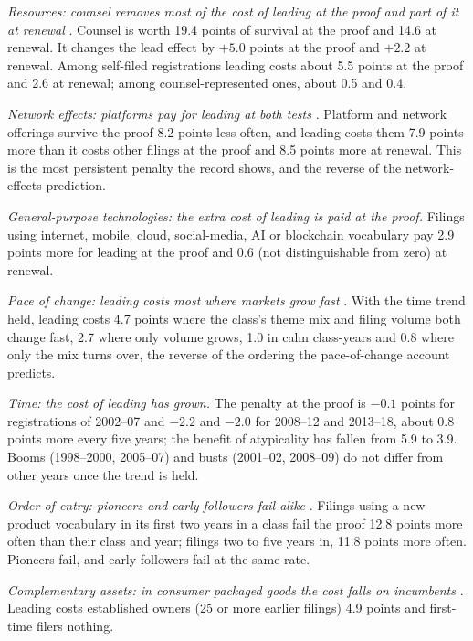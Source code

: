 \emph{Resources: counsel removes most of the cost of leading at the proof
and part of it at renewal} \citep{LiebermanMontgomery1998}. Counsel is
worth 19.4 points of survival at the proof and 14.6 at renewal. It
changes the lead effect by $+5.0$ points at the proof and $+2.2$ at
renewal. Among self-filed registrations leading costs about 5.5 points
at the proof and 2.6 at renewal; among counsel-represented ones, about
0.5 and 0.4.

\emph{Network effects: platforms pay for leading at both tests}
\citep{LiebermanMontgomery1988}. Platform and network offerings survive
the proof 8.2 points less often, and leading costs them 7.9 points more
than it costs other filings at the proof and 8.5 points more at
renewal. This is the most persistent penalty the record shows, and the
reverse of the network-effects prediction.

\emph{General-purpose technologies: the extra cost of leading is paid at
the proof.} Filings using internet, mobile, cloud, social-media, AI or
blockchain vocabulary pay 2.9 points more for leading at the proof and
0.6 (not distinguishable from zero) at renewal.

\emph{Pace of change: leading costs most where markets grow fast}
\citep{SuarezLanzolla2007}. With the time trend held, leading costs 4.7
points where the class's theme mix and filing volume both change fast,
2.7 where only volume grows, 1.0 in calm class-years and 0.8 where only
the mix turns over, the reverse of the ordering the pace-of-change
account predicts.

\emph{Time: the cost of leading has grown.} The penalty at the proof is
$-0.1$ points for registrations of 2002--07 and $-2.2$ and $-2.0$ for
2008--12 and 2013--18, about 0.8 points more every five years; the
benefit of atypicality has fallen from 5.9 to 3.9. Booms (1998--2000,
2005--07) and busts (2001--02, 2008--09) do not differ from other years
once the trend is held.

\emph{Order of entry: pioneers and early followers fail alike}
\citep{GolderTellis1993}. Filings using a new product vocabulary in its
first two years in a class fail the proof 12.8 points more often than
their class and year; filings two to five years in, 11.8 points more
often. Pioneers fail, and early followers fail at the same rate.

\emph{Complementary assets: in consumer packaged goods the cost falls on
incumbents} \citep{Teece1986}. Leading costs established owners (25 or
more earlier filings) 4.9 points and first-time filers nothing.

